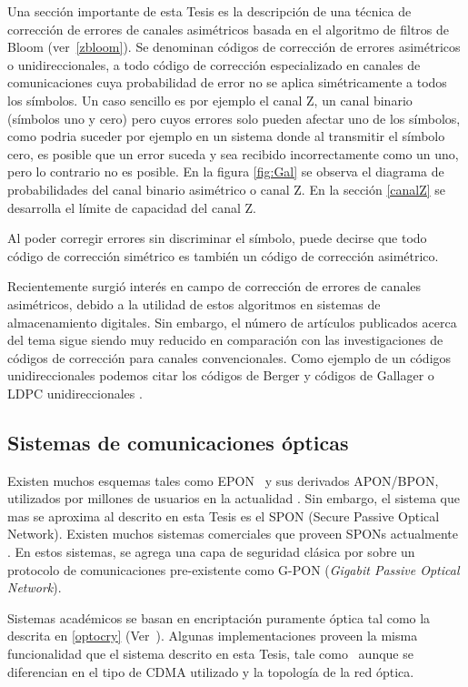 Una sección importante de esta Tesis es la descripción de una técnica de corrección de errores de canales asimétricos basada en el algoritmo de filtros de Bloom (ver~\ref{zbloom}). 
Se denominan códigos de corrección de errores asimétricos o unidireccionales, a todo código de corrección especializado en canales de comunicaciones cuya probabilidad de error no se aplica simétricamente a todos los símbolos. Un caso sencillo es por ejemplo el canal Z, un canal binario (símbolos uno y cero) pero cuyos errores solo pueden afectar uno de los símbolos, como podria suceder por ejemplo en un sistema donde al transmitir el símbolo cero, es posible que un error suceda y sea recibido incorrectamente como un uno, pero lo contrario no es posible. En la figura \ref{fig:Gal} se observa el diagrama de probabilidades del canal binario asimétrico o canal Z. En la sección \ref{canalZ} se desarrolla el límite de capacidad del canal Z.

 Al poder corregir errores sin discriminar el símbolo, puede decirse que todo código de corrección simétrico es también un código de corrección asimétrico.

Recientemente surgió interés en campo de corrección de errores de canales asimétricos, debido a la utilidad de estos algoritmos en sistemas de almacenamiento digitales\cite{tanakamaru201195}. Sin embargo, el número de artículos publicados acerca del tema sigue siendo muy reducido en comparación con las investigaciones de códigos de corrección para canales convencionales. Como ejemplo de un códigos unidireccionales podemos citar los códigos de Berger \cite{berger1961note} y códigos de Gallager o LDPC unidireccionales \cite{neri2008gallager}.

\subsection{Sistemas de comunicaciones ópticas}

Existen muchos esquemas tales como EPON~\cite{kramer2002ethernet} y sus derivados APON/BPON, utilizados por millones de usuarios en la actualidad \cite{chanclou2013france}.
Sin embargo, el sistema que mas se aproxima al descrito en esta Tesis es el SPON (Secure Passive Optical Network). Existen muchos sistemas comerciales que proveen SPONs actualmente \cite{armoredshield}. En estos sistemas, se agrega una capa de seguridad clásica por sobre un protocolo de comunicaciones pre-existente como G-PON (\textit{Gigabit Passive Optical Network}).

Sistemas académicos se basan en encriptación puramente óptica tal como la descrita en \ref{optocry} (Ver~\cite{cincotti2009secure}). Algunas implementaciones proveen la misma funcionalidad que el sistema descrito en esta Tesis, tale como~\cite{nadarajah2006implementation} aunque se diferencian en el tipo de CDMA utilizado y la topología de la red óptica.

